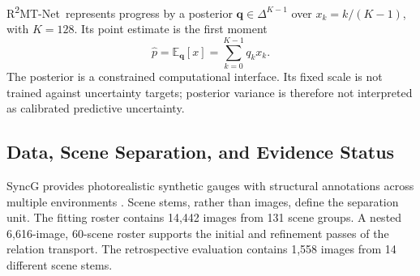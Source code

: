 \documentclass[electronics,article,submit,oneauthor]{Definitions/mdpi}
\newcommand{\modelname}{R\textsuperscript{2}MT-Net}
\begin{document}
\modelname\ represents progress by a posterior $\mathbf q\in\Delta^{K-1}$ over $x_k=k/(K-1)$, with $K=128$. Its point estimate is the first moment
\begin{equation}
\hat p=\mathbb E_{\mathbf q}[x]=\sum_{k=0}^{K-1}q_kx_k.
\label{eq:posterior_mean}
\end{equation}
The posterior is a constrained computational interface. Its fixed scale is not trained against uncertainty targets; posterior variance is therefore not interpreted as calibrated predictive uncertainty.

\subsection{Data, Scene Separation, and Evidence Status}
\label{subsec:data}

SyncG provides photorealistic synthetic gauges with structural annotations across multiple environments \cite{deng2026syncg}. Scene stems, rather than images, define the separation unit. The fitting roster contains 14,442 images from 131 scene groups. A nested 6,616-image, 60-scene roster supports the initial and refinement passes of the relation transport. The retrospective evaluation contains 1,558 images from 14 different scene stems.
\end{document}
